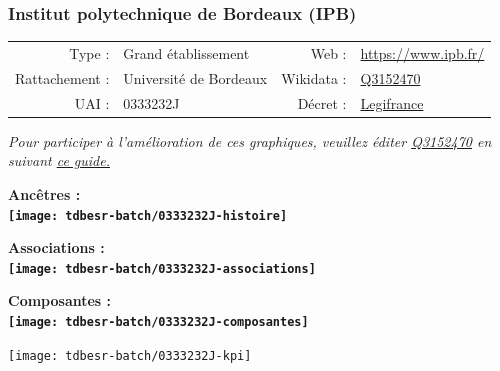 \documentclass[12pt,french,]{article}
\begin{document}
\hypertarget{institut-polytechnique-de-bordeaux-ipb}{%
\subsubsection{Institut polytechnique de Bordeaux
(IPB)}\label{institut-polytechnique-de-bordeaux-ipb}}

\begin{tabular*}{\textwidth}{rp{5cm}rl}  
\hline  
Type : & Grand établissement & Web : &\href{https://www.ipb.fr/}{https://www.ipb.fr/} \\  
Rattachement : & Université de Bordeaux & Wikidata : & \href{https://www.wikidata.org/entity/Q3152470}{Q3152470} \\  
UAI : & 0333232J & Décret : & \href{http://legifrance.gouv.fr/affichTexte.do?cidTexte=JORFTEXT000030820446&dateTexte=&categorieLien=id}{Legifrance} \\  
\hline  
\end{tabular*}

\textit{\scriptsize Pour participer à l'amélioration de ces graphiques, veuillez éditer  \href{https://www.wikidata.org/entity/Q3152470}{Q3152470}  en suivant \href{https://github.com/cpesr/wikidataESR/blob/master/Rmd/wikidataESR.md}{ce guide.}}

\vspace{1cm}  
\begin{minipage}[b]{0.50\textwidth}\begin{center} \bf Ancêtres : \\  
\texttt{[image: tdbesr-batch/0333232J-histoire]} \end{center}\end{minipage}\begin{minipage}[b]{0.50\textwidth}\begin{center} \bf Associations : \\  
\texttt{[image: tdbesr-batch/0333232J-associations]} \end{center}\end{minipage}

\hrulefill

\begin{center} \bf Composantes : \\  
\texttt{[image: tdbesr-batch/0333232J-composantes]} \end{center}

\begin{center}\texttt{[image: tdbesr-batch/0333232J-kpi]} \end{center}\checkoddpage
\end{document}
